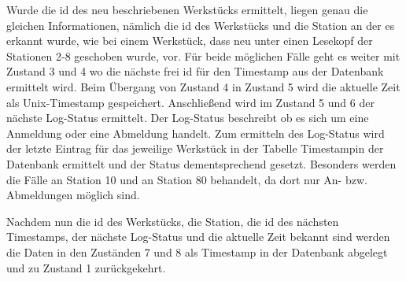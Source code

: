 Wurde die id des neu beschriebenen Werkstücks ermittelt, liegen genau die gleichen Informationen, nämlich die id des Werkstücks und die Station an der es erkannt wurde, wie bei einem Werkstück, dass neu unter einen Lesekopf der Stationen 2-8 geschoben wurde, vor. Für beide möglichen Fälle geht es weiter mit Zustand 3 und 4 wo die nächste frei id für den Timestamp aus der Datenbank ermittelt wird. Beim Übergang von Zustand 4 in Zustand 5 wird die aktuelle Zeit als Unix-Timestamp gespeichert. Anschließend wird im Zustand 5 und 6 der nächste Log-Status ermittelt. Der Log-Status beschreibt ob es sich um eine Anmeldung oder eine Abmeldung handelt. Zum ermitteln des Log-Status wird der letzte Eintrag für das jeweilige Werkstück in der Tabelle \glqq Timestamp\grqq  in der Datenbank ermittelt und der Status dementsprechend gesetzt. Besonders werden die Fälle an Station 10 und an Station 80 behandelt, da dort nur An- bzw. Abmeldungen möglich sind.

Nachdem nun die id des Werkstücks, die Station, die id des nächsten Timestamps, der nächste Log-Status und die aktuelle Zeit bekannt sind werden die Daten in den Zuständen 7 und 8 als Timestamp in der Datenbank abgelegt und zu Zustand 1 zurückgekehrt.

